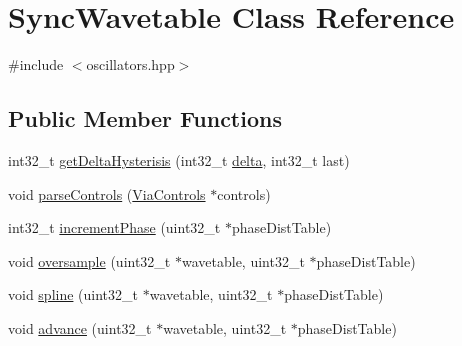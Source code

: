 \hypertarget{class_sync_wavetable}{}\section{Sync\+Wavetable Class Reference}
\label{class_sync_wavetable}


{\ttfamily \#include $<$oscillators.\+hpp$>$}

\subsection*{Public Member Functions}
\begin{DoxyCompactItemize}
\item 
int32\+\_\+t \mbox{\hyperlink{class_sync_wavetable_aa8167f7716afc76e70766a76077240b7}{get\+Delta\+Hysterisis}} (int32\+\_\+t \mbox{\hyperlink{class_sync_wavetable_a0a67b9bb161d1ec283d179f80a7bc62a}{delta}}, int32\+\_\+t last)
\item 
void \mbox{\hyperlink{class_sync_wavetable_a93a65d5450f25e2bf840a5a3f5a7b429}{parse\+Controls}} (\mbox{\hyperlink{class_via_controls}{Via\+Controls}} $\ast$controls)
\item 
int32\+\_\+t \mbox{\hyperlink{class_sync_wavetable_a3d20e97e3f3bdb31a3aff5125b1db858}{increment\+Phase}} (uint32\+\_\+t $\ast$phase\+Dist\+Table)
\item 
void \mbox{\hyperlink{class_sync_wavetable_a1407a6089d1985273af939fefdb52648}{oversample}} (uint32\+\_\+t $\ast$wavetable, uint32\+\_\+t $\ast$phase\+Dist\+Table)
\item 
void \mbox{\hyperlink{class_sync_wavetable_af960ab099894fb6ea6b0206bdd5b7faf}{spline}} (uint32\+\_\+t $\ast$wavetable, uint32\+\_\+t $\ast$phase\+Dist\+Table)
\item 
void \mbox{\hyperlink{class_sync_wavetable_acd0675d2c450cab445402407751a8d0e}{advance}} (uint32\+\_\+t $\ast$wavetable, uint32\+\_\+t $\ast$phase\+Dist\+Table)
\end{DoxyCompactItemize}
